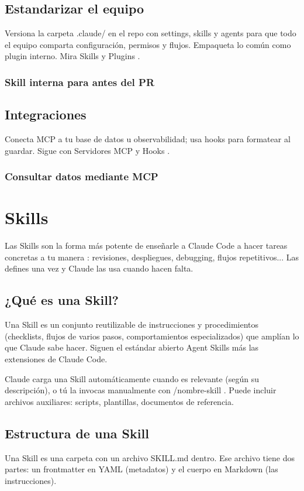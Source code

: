 \documentclass[11pt,a4paper]{book}
\begin{document}
\section{Estandarizar el equipo}
Versiona la carpeta .claude/ en el repo con settings, skills y agents para que todo el equipo comparta configuración, permisos y flujos. Empaqueta lo común como plugin interno. Mira Skills y Plugins .

\subsection{Skill interna para antes del PR}
\section{Integraciones}
Conecta MCP a tu base de datos u observabilidad; usa hooks para formatear al guardar. Sigue con Servidores MCP y Hooks .

\subsection{Consultar datos mediante MCP}
\chapter{Skills}
Las Skills son la forma más potente de enseñarle a Claude Code a hacer tareas concretas a tu manera : revisiones, despliegues, debugging, flujos repetitivos... Las defines una vez y Claude las usa cuando hacen falta.

\section{¿Qué es una Skill?}
Una Skill es un conjunto reutilizable de instrucciones y procedimientos (checklists, flujos de varios pasos, comportamientos especializados) que amplían lo que Claude sabe hacer. Siguen el estándar abierto Agent Skills más las extensiones de Claude Code.

Claude carga una Skill automáticamente cuando es relevante (según su descripción), o tú la invocas manualmente con /nombre-skill . Puede incluir archivos auxiliares: scripts, plantillas, documentos de referencia.

\section{Estructura de una Skill}
Una Skill es una carpeta con un archivo SKILL.md dentro. Ese archivo tiene dos partes: un frontmatter en YAML (metadatos) y el cuerpo en Markdown (las instrucciones).
\end{document}
